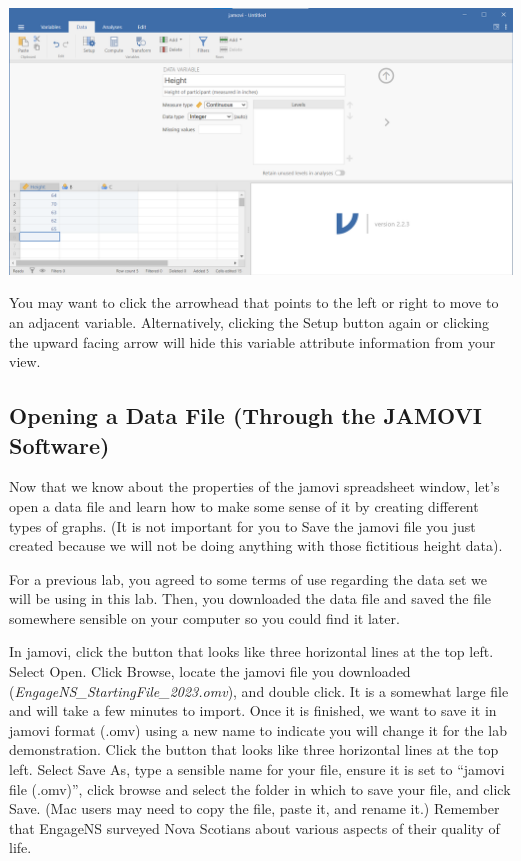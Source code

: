\documentclass[
]{book}
\begin{document}
\includegraphics{img/1.5.2.3.png}

You may want to click the arrowhead that points to the left or right to move to an adjacent variable. Alternatively, clicking the {Setup} button again or clicking the upward facing arrow will hide this variable attribute information from your view.

\hypertarget{opening-a-data-file-through-the-jamovi-software}{%
\subsection{Opening a Data File (Through the JAMOVI Software)}\label{opening-a-data-file-through-the-jamovi-software}}

Now that we know about the properties of the jamovi spreadsheet window, let's open a data file and learn how to make some sense of it by creating different types of graphs. (It is not important for you to {Save} the jamovi file you just created because we will not be doing anything with those fictitious height data).

For a previous lab, you agreed to some terms of use regarding the data set we will be using in this lab. Then, you downloaded the data file and saved the file somewhere sensible on your computer so you could find it later.

In jamovi, click the button that looks like three horizontal lines at the top left. Select {Open}. Click {Browse}, locate the jamovi file you downloaded (\emph{EngageNS\_StartingFile\_2023.omv}), and double click. It is a somewhat large file and will take a few minutes to import. Once it is finished, we want to save it in jamovi format (.omv) using a new name to indicate you will change it for the lab demonstration. Click the button that looks like three horizontal lines at the top left. Select {Save As}, type a sensible name for your file, ensure it is set to ``jamovi file (.omv)'', click browse and select the folder in which to save your file, and click {Save}. (Mac users may need to copy the file, paste it, and rename it.) Remember that EngageNS surveyed Nova Scotians about various aspects of their quality of life.
\end{document}
